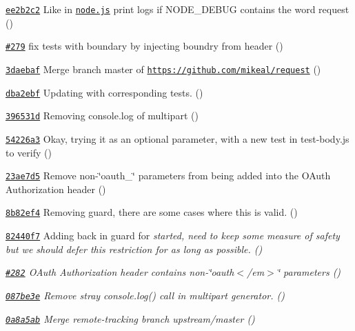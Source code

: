 \begin{DoxyItemize}
\item \href{https://github.com/mikeal/request/commit/ee2b2c2f7a8625fde4d71d79e19cdc5d98f09955}{\tt ee2b2c2} Like in \href{https://github.com/joyent/node/blob/master/lib/net.js#L52}{\tt node.\+js} print logs if N\+O\+D\+E\+\_\+\+D\+E\+B\+U\+G contains the word request ()
\item \href{https://github.com/mikeal/request/pull/279}{\tt \#279} fix tests with boundary by injecting boundry from header ()
\item \href{https://github.com/mikeal/request/commit/3daebaf2551c8d0df7dac1ebff0af4fe08608768}{\tt 3daebaf} Merge branch \textquotesingle{}master\textquotesingle{} of \href{https://github.com/mikeal/request}{\tt https\+://github.\+com/mikeal/request} ()
\item \href{https://github.com/mikeal/request/commit/dba2ebf09552258f37b60122c19b236064b0d216}{\tt dba2ebf} Updating with corresponding tests. ()
\item \href{https://github.com/mikeal/request/commit/396531d083c94bc807a25f7c3a50a0c92a00c5f7}{\tt 396531d} Removing console.\+log of multipart ()
\item \href{https://github.com/mikeal/request/commit/54226a38816b4169e0a7a5d8b1a7feba78235fec}{\tt 54226a3} Okay, trying it as an optional parameter, with a new test in test-\/body.\+js to verify ()
\item \href{https://github.com/mikeal/request/commit/23ae7d576cc63d645eecf057112b71d6cb73e7b1}{\tt 23ae7d5} Remove non-\/\char`\"{}oauth\+\_\+\char`\"{} parameters from being added into the O\+Auth Authorization header ()
\item \href{https://github.com/mikeal/request/commit/8b82ef4ff0b50b0c8dcfb830f62466fa30662666}{\tt 8b82ef4} Removing guard, there are some cases where this is valid. ()
\item \href{https://github.com/mikeal/request/commit/82440f76f22a5fca856735af66e2dc3fcf240c0d}{\tt 82440f7} Adding back in guard for {\itshape started, need to keep some measure of safety but we should defer this restriction for as long as possible. ()}
\item {\itshape \href{https://github.com/mikeal/request/pull/282}{\tt \#282} O\+Auth Authorization header contains non-\/\char`\"{}oauth$<$/em$>$\char`\"{} parameters ()}
\item {\itshape \href{https://github.com/mikeal/request/commit/087be3ebbada53699d14839374f1679f63f3138f}{\tt 087be3e} Remove stray {\ttfamily console.\+log()} call in multipart generator. ()}
\item {\itshape \href{https://github.com/mikeal/request/commit/0a8a5ab6a08eaeffd45ef4e028be2259d61bb0ee}{\tt 0a8a5ab} Merge remote-\/tracking branch \textquotesingle{}upstream/master\textquotesingle{} ()}

\end{DoxyItemize}

